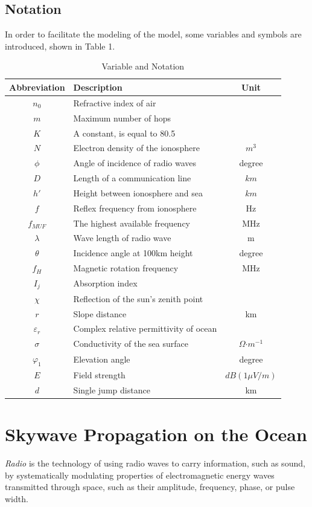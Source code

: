 \documentclass{mcmthesis}
\begin{document}
\subsection{Notation}
In order to facilitate the modeling of the model, some variables and symbols are introduced, shown in Table 1.
 \begin{longtable}{c  l c}
 \caption{Variable and Notation} \\
  \toprule
  Abbreviation & Description & Unit\\
  \midrule
  $n_0$ & Refractive index of air\\
   $m$ & Maximum number of hops \\
  $K$ & A constant, is equal to 80.5\\
 $N$ & Electron density of the ionosphere & $m^3$ \\
  $\phi$ & Angle of incidence of radio waves & degree \\
  $D$ & Length of a communication line & $km$\\
  $h'$ & Height between ionosphere and sea   & $km$\\
    $f$ & Reflex frequency from  ionosphere & Hz\\
    $f_{MUF}$ & The highest available frequency & MHz\\
    $\lambda$ & Wave length of radio wave & m\\
    $\theta$ & Incidence angle at 100km height & degree \\
    $f_H$ & Magnetic rotation frequency & MHz\\
    $I_j$& Absorption index \\
    $\chi$ & Reflection of the sun's zenith point &\\ 
    $r$ & Slope distance & km\\
     $\varepsilon_r$ & Complex relative permittivity of ocean\\
     $\sigma$ & Conductivity of the sea surface & $\Omega \bm\cdot m^{-1}$ \\
     $\varphi_1$ & Elevation angle & degree \\
     $E$ &Field strength & $dB(1\mu V/m)$ \\
     $d$ & Single jump distance & km\\
  \bottomrule
 \end{longtable}
 
 \section{Skywave Propagation on the Ocean}
\textit{Radio} is the technology of using radio waves to carry information, such as sound, by systematically modulating properties of electromagnetic energy waves transmitted through space, such as their amplitude, frequency, phase, or pulse width.
\end{document}
